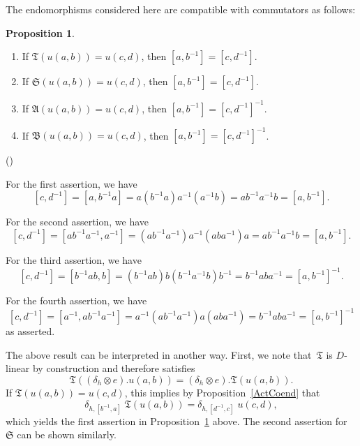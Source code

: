 \documentclass[12pt]{article}
\makeatletter
\newcounter{num}
\newenvironment{pflist}{\begin{list}{(\arabic{num})}{\usecounter{num} \leftmargin0cm \itemindent5pt}}{\end{list}}
\theoremstyle{definition}
\newtheorem{Proposition}[Satz]{Proposition}
\theoremstyle{break}
\renewenvironment{proof}[1][\proofname]{\par
\vspace{-5pt}%
\pushQED{\qed}%
\normalfont
\topsep0pt \partopsep0pt %
\trivlist
\item[\hskip\labelsep
\bfseries
#1\@addpunct{.}]\ignorespaces
}{%
\popQED\endtrivlist\@endpefalse
\addvspace{6pt plus 6pt} %
}
\newcommand{\fA}{\mathfrak{A}}
\newcommand{\fB}{\mathfrak{B}}
\newcommand{\fS}{\mathfrak{S}}
\newcommand{\fT}{\mathfrak{T}}
\renewcommand{\1}{\mathbbm{1}}
\newcommand{\ot}{\mathbin{\otimes}}
\newcommand{\uu}{u}
\makeatother
\begin{document}
The endomorphisms considered here are compatible with commutators as follows:
\begin{Proposition} \label{TSABComm}
\begin{enumerate}
\item
If $\fT(\uu(a,b)) = \uu(c,d)$, then $[a,b^{-1}] = [c,d^{-1}]$.

\item
If $\fS(\uu(a,b)) = \uu(c,d)$, then $[a,b^{-1}] = [c,d^{-1}]$.

\item
If $\fA(\uu(a,b)) = \uu(c,d)$, then $[a,b^{-1}] = [c,d^{-1}]^{-1}$.

\item
If $\fB(\uu(a,b)) = \uu(c,d)$, then $[a,b^{-1}] = [c,d^{-1}]^{-1}$.
\end{enumerate}
\end{Proposition}
\begin{proof}
\begin{pflist}
\item
For the first assertion, we have
\[[c,d^{-1}] = [a, b^{-1} a] = a (b^{-1} a) a^{-1} (a^{-1} b) = a b^{-1} a^{-1} b
= [a,b^{-1}].\]

\item
For the second assertion, we have
\[[c,d^{-1}] = [a b^{-1} a^{-1}, a^{-1}] = (a b^{-1} a^{-1}) a^{-1} (a b a^{-1}) a
= a b^{-1} a^{-1} b = [a,b^{-1}].\]

\item
For the third assertion, we have
\[[c,d^{-1}] = [b^{-1} a b, b] = (b^{-1} a b) b (b^{-1} a^{-1} b) b^{-1}  =
b^{-1} a b a^{-1} = [a,b^{-1}]^{-1}.\]

\item
For the fourth assertion, we have
\[[c,d^{-1}] = [a^{-1}, a b^{-1} a^{-1}] = a^{-1} (a b^{-1} a^{-1}) a (a b a^{-1})
=  b^{-1} a b a^{-1}  = [a,b^{-1}]^{-1}\]
as asserted. \qedhere
\end{pflist}
\end{proof}

The above result can be interpreted in another way. First, we note that~$\fT$ is $D$-linear by construction and therefore satisfies
\[\fT((\delta_{h} \ot e).u(a,b)) = (\delta_{h} \ot e).\fT(u(a,b)).\]
If $\fT(\uu(a,b)) = \uu(c,d)$, this implies by Proposition~\ref{ActCoend} that
\[\delta_{h,[b^{-1},a]} \; \fT(u(a,b)) = \delta_{h,[d^{-1},c]} \; u(c,d),\]
which yields the first assertion in Proposition~\ref{TSABComm} above. The second assertion for~$\fS$ can be shown similarly.
\end{document}
